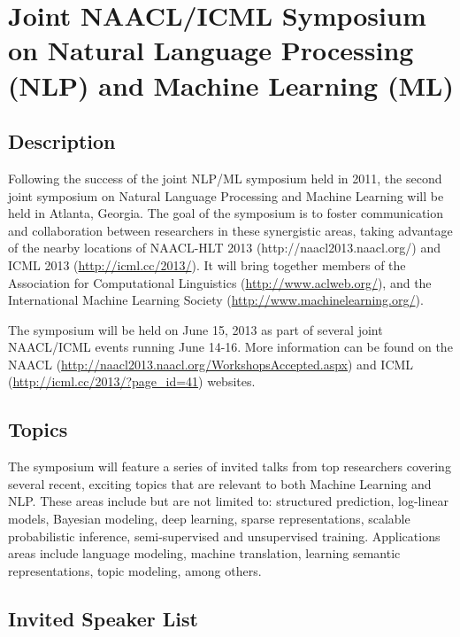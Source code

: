 \section*{Joint NAACL/ICML Symposium on Natural Language Processing (NLP) and Machine Learning (ML)}

\date{June 15, 2013 \\
  Atlanta, Georgia, USA\\
  Website: https://sites.google.com/site/nlpml2013/
}

\subsection{Description}

Following the success of the joint NLP/ML symposium held in 2011, the second joint symposium on
Natural Language Processing and Machine Learning will be held in Atlanta, Georgia. The goal of the
symposium is to foster communication and collaboration between researchers in these synergistic
areas, taking advantage of the nearby locations of NAACL-HLT 2013 (http://naacl2013.naacl.org/) and
ICML 2013 (\url{http://icml.cc/2013/}). It will bring together members of the Association for
Computational Linguistics (\url{http://www.aclweb.org/}), and the International Machine Learning
Society (\url{http://www.machinelearning.org/}).

The symposium will be held on June 15, 2013 as part of several joint NAACL/ICML events running June
14-16. More information can be found on the NAACL
(\url{http://naacl2013.naacl.org/WorkshopsAccepted.aspx}) and ICML
(\url{http://icml.cc/2013/?page_id=41}) websites.

\subsection{Topics}

The symposium will feature a series of invited talks from top researchers covering several recent,
exciting topics that are relevant to both Machine Learning and NLP. These areas include but are not
limited to: structured prediction, log-linear models, Bayesian modeling, deep learning, sparse
representations, scalable probabilistic inference, semi-supervised and unsupervised
training. Applications areas include language modeling, machine translation, learning semantic
representations, topic modeling, among others.

\subsection{Invited Speaker List}

